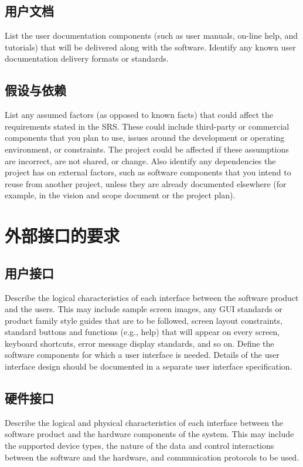 \documentclass{ctexart}
\begin{document}
\subsection{用户文档}
List the user documentation components (such as user manuals, on-line help, 
and tutorials) that will be delivered along with the software. Identify any 
known user documentation delivery formats or standards.


\subsection{假设与依赖}
List any assumed factors (as opposed to known facts) that could affect the 
requirements stated in the SRS. These could include third-party or commercial 
components that you plan to use, issues around the development or operating 
environment, or constraints. The project could be affected if these assumptions 
are incorrect, are not shared, or change. Also identify any dependencies the 
project has on external factors, such as software components that you intend to 
reuse from another project, unless they are already documented elsewhere (for 
example, in the vision and scope document or the project plan).



\section{外部接口的要求}
\subsection{用户接口}
Describe the logical characteristics of each interface between the software 
product and the users. This may include sample screen images, any GUI standards 
or product family style guides that are to be followed, screen layout 
constraints, standard buttons and functions (e.g., help) that will appear on 
every screen, keyboard shortcuts, error message display standards, and so on.  
Define the software components for which a user interface is needed. Details of 
the user interface design should be documented in a separate user interface 
specification.


\subsection{硬件接口}
Describe the logical and physical characteristics of each interface between 
the software product and the hardware components of the system. This may include 
the supported device types, the nature of the data and control interactions 
between the software and the hardware, and communication protocols to be 
used.
\end{document}
